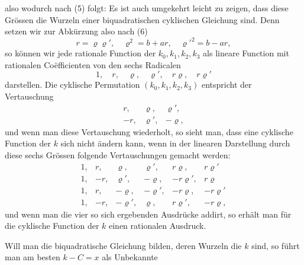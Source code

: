 also
wodurch nach (5) folgt:
Es ist auch umgekehrt leicht zu zeigen, dass diese Grössen
die Wurzeln einer biquadratischen cyklischen Gleichung sind.
Denn setzen wir zur Abkürzung
also nach (6)
\[ r = \varrho\varrho', \quad \varrho^2 = b+ar, \quad \varrho'^2 = b-ar, \]
so können wir jede rationale Function der $k_0, k_1, k_2, k_3$ als lineare
Function mit rationalen Coëfficienten von den sechs Radicalen
\[ 1, \quad r, \quad \varrho, \quad \varrho', \quad r\varrho, \quad r\varrho' \]
darstellen. Die cyklische Permutation $(k_0, k_1, k_2, k_3)$ entspricht
der Vertauschung
\[
\begin{array}{lll}
r, & \varrho, & \varrho',\\
-r, & \varrho', & -\varrho,
\end{array}
\]
und wenn man diese Vertauschung wiederholt, so sieht man,
dass eine cyklische Function der $k$ sich nicht ändern kann,
wenn in der linearen Darstellung durch diese sechs Grössen
folgende Vertauschungen gemacht werden:
\[
\begin{array}{llllll}
1, & r, & \varrho, & \varrho', & r\varrho, & r\varrho'\\
1, & -r, & \varrho', & -\varrho, & -r\varrho', & r\varrho\\
1, & r, & -\varrho, & -\varrho', & -r\varrho, & -r\varrho'\\
1, & -r, & -\varrho', & \varrho, & r\varrho', & -r\varrho,
\end{array}
\]
und wenn man die vier so sich ergebenden Ausdrücke addirt,
so erhält man für die cyklische Function der $k$ einen rationalen
Ausdruck.

Will man die biquadratische Gleichung bilden, deren Wurzeln
die $k$ sind, so führt man am besten $k - C = x$ als Unbekannte
